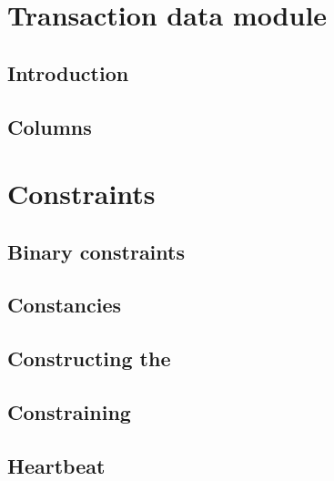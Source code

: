 
\section{Transaction data module}                                           \label{txn_data: generalities}
\subsection{Introduction}                                                   \label{txn_data: generalities: intro}                         
\subsection{Columns}                                                        \label{txn_data: generalities: columns}                       
    
\section{Constraints}                                                       \label{txn_data: constraints}    
\subsection{Binary constraints}                                             \label{txn_data: constraints: binary}                         
\subsection{Constancies}                                                    \label{txn_data: constraints: constancies}                    
\subsection{Constructing the \ABSTXNUM{}}                                   \label{txn_data: constraints: constructing ABS}               
\subsection{Constraining \txFirstTransactionInBlock{}}                      \label{txn_data: constraints: constraining FIRST_IN_BLOCK}    
\subsection{Heartbeat}                                                      \label{txn_data: constraints: heartbeat}                      
